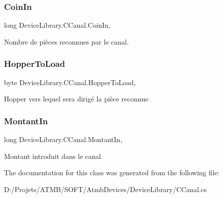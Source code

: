 \subsubsection{\texorpdfstring{Coin\+In}{CoinIn}}
{\footnotesize\ttfamily long Device\+Library.\+C\+Canal.\+Coin\+In\hspace{0.3cm}{\ttfamily [get]}, {\ttfamily [set]}}



Nombre de pièces reconnues par le canal. 

\mbox{\label{class_device_library_1_1_c_canal_a4b920e01736bd1a067401c6cc76e2e4e}} 
\subsubsection{\texorpdfstring{Hopper\+To\+Load}{HopperToLoad}}
{\footnotesize\ttfamily byte Device\+Library.\+C\+Canal.\+Hopper\+To\+Load\hspace{0.3cm}{\ttfamily [get]}, {\ttfamily [set]}}



Hopper vers lequel sera dirigé la pièce reconnue 

\mbox{\label{class_device_library_1_1_c_canal_ac80e273e29e18b3f2b598aaf9f04506f}} 
\subsubsection{\texorpdfstring{Montant\+In}{MontantIn}}
{\footnotesize\ttfamily long Device\+Library.\+C\+Canal.\+Montant\+In\hspace{0.3cm}{\ttfamily [get]}, {\ttfamily [set]}}



Montant introduit dans le canal 



The documentation for this class was generated from the following file\+:\begin{DoxyCompactItemize}
\item 
D\+:/\+Projets/\+A\+T\+M\+B/\+S\+O\+F\+T/\+Atmb\+Devices/\+Device\+Library/C\+Canal.\+cs\end{DoxyCompactItemize}
